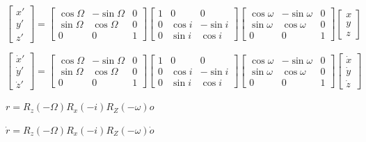 \documentclass{article}
\begin{document}
$\begin{bmatrix}
	x' \\
	y' \\
	z'
\end{bmatrix}
=
\begin{bmatrix}
	\cos\Omega & -\sin\Omega  & 0 \\
	\sin\Omega & \cos\Omega  & 0  \\
	0 & 0 & 1
\end{bmatrix}
\begin{bmatrix}
	1 & 0  & 0 \\
	0 & \cos i  & -\sin i  \\
	0 & \sin i & \cos i
\end{bmatrix}
\begin{bmatrix}
	\cos\omega & -\sin\omega  & 0 \\
	\sin\omega & \cos\omega  & 0  \\
	0 & 0 & 1
\end{bmatrix}
\begin{bmatrix}
	x \\
	y \\
	z
\end{bmatrix}$

$\begin{bmatrix}
	\dot{x}' \\
	\dot{y}' \\
	\dot{z}'
\end{bmatrix}
=
\begin{bmatrix}
	\cos\Omega & -\sin\Omega  & 0 \\
	\sin\Omega & \cos\Omega  & 0  \\
	0 & 0 & 1
\end{bmatrix}
\begin{bmatrix}
	1 & 0  & 0 \\
	0 & \cos i  & -\sin i  \\
	0 & \sin i & \cos i
\end{bmatrix}
\begin{bmatrix}
	\cos\omega & -\sin\omega  & 0 \\
	\sin\omega & \cos\omega  & 0  \\
	0 & 0 & 1
\end{bmatrix}
\begin{bmatrix}
	\dot{x} \\
	\dot{y} \\
	\dot{z}
\end{bmatrix} $

$r = R_z(-\Omega) R_x(-i) R_Z(-\omega)o$

$\dot{r} = R_z(-\Omega) R_x(-i) R_Z(-\omega)\dot{o}$
\end{document}
